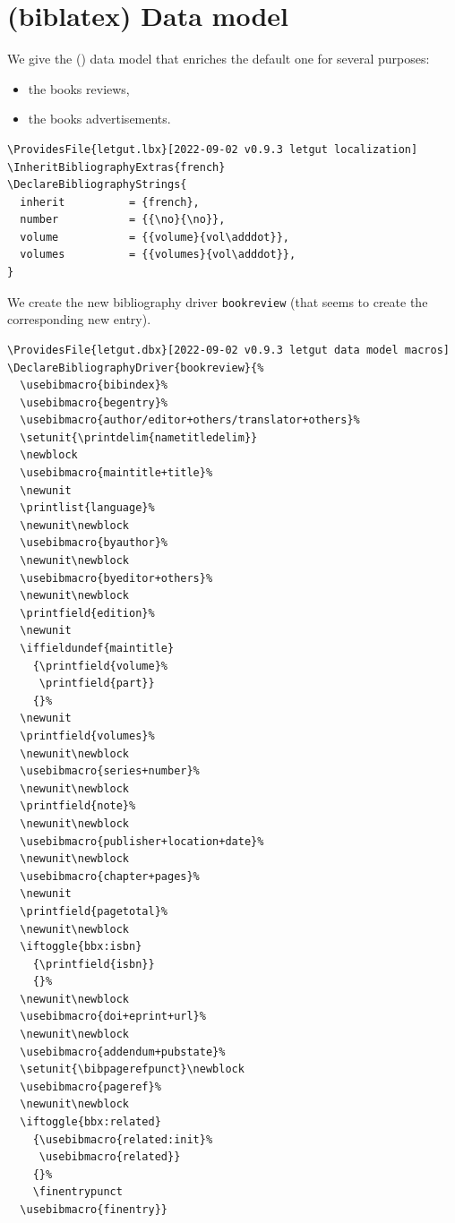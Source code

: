 \documentclass{letgut}
\begin{document}
\section{(biblatex) Data model}
\label{sec:org7f2c4f3}

We give the () data model that enriches the default one for
several purposes:
\begin{itemize}
\item the books reviews,
\item the books advertisements.
\end{itemize}

\begin{lstlisting}
\ProvidesFile{letgut.lbx}[2022-09-02 v0.9.3 letgut localization]
\InheritBibliographyExtras{french}
\DeclareBibliographyStrings{
  inherit          = {french},
  number           = {{\no}{\no}},
  volume           = {{volume}{vol\adddot}},
  volumes          = {{volumes}{vol\adddot}},
}
\end{lstlisting}

We create the new bibliography driver \lstinline+bookreview+ (that seems to
create the corresponding new entry).

\begin{lstlisting}
\ProvidesFile{letgut.dbx}[2022-09-02 v0.9.3 letgut data model macros]
\DeclareBibliographyDriver{bookreview}{%
  \usebibmacro{bibindex}%
  \usebibmacro{begentry}%
  \usebibmacro{author/editor+others/translator+others}%
  \setunit{\printdelim{nametitledelim}}
  \newblock
  \usebibmacro{maintitle+title}%
  \newunit
  \printlist{language}%
  \newunit\newblock
  \usebibmacro{byauthor}%
  \newunit\newblock
  \usebibmacro{byeditor+others}%
  \newunit\newblock
  \printfield{edition}%
  \newunit
  \iffieldundef{maintitle}
    {\printfield{volume}%
     \printfield{part}}
    {}%
  \newunit
  \printfield{volumes}%
  \newunit\newblock
  \usebibmacro{series+number}%
  \newunit\newblock
  \printfield{note}%
  \newunit\newblock
  \usebibmacro{publisher+location+date}%
  \newunit\newblock
  \usebibmacro{chapter+pages}%
  \newunit
  \printfield{pagetotal}%
  \newunit\newblock
  \iftoggle{bbx:isbn}
    {\printfield{isbn}}
    {}%
  \newunit\newblock
  \usebibmacro{doi+eprint+url}%
  \newunit\newblock
  \usebibmacro{addendum+pubstate}%
  \setunit{\bibpagerefpunct}\newblock
  \usebibmacro{pageref}%
  \newunit\newblock
  \iftoggle{bbx:related}
    {\usebibmacro{related:init}%
     \usebibmacro{related}}
    {}%
    \finentrypunct
  \usebibmacro{finentry}}
\end{lstlisting}
\end{document}
